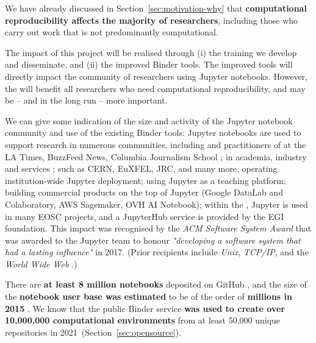 We have already discussed in Section~\ref{sec:motivation-why} that
\textbf{computational reproducibility affects the majority of researchers},
including those who carry out work that is not predominantly computational.

The impact of this project will be realised through (i) the training we develop
and disseminate, and (ii) the improved Binder tools. The improved tools will
directly impact the community of researchers using Jupyter notebooks. However,
the  will benefit all researchers who need computational reproducibility, and
may be -- and in the long run -- more important.

\medskip

We can give some indication of the size and activity of the Jupyter notebook
community and use of the existing Binder tools: Jupyter notebooks are used to
support research in numerous communities, including
{} and practitioners of  at the LA Times, BuzzFeed News, Columbia Journalism School
\cite{latimes-datadesk} \cite{columbia-nytimes} \cite{data-journalism};
 in academia, industry and services \cite{Perkel2018};
{} such as CERN, EuXFEL, JRC, and many more,
operating institution-wide Jupyter deployment;
{} using Jupyter as a teaching platform;
{} building commercial products on the
top of Jupyter (Google DataLab and Colaboratory, AWS Sagemaker, OVH AI Notebook);
within the , Jupyter is used in many EOSC
projects, and a JupyterHub service is provided by the EGI foundation.
This impact was recognised by the \emph{ACM Software System Award} that was
awarded to the Jupyter team to honour \emph{"developing a software system that
had a lasting influence"} in 2017. (Prior recipients include \emph{Unix},
\emph{TCP/IP}, and the \emph{World Wide Web} \cite{acm-award}.)

There are \textbf{at least 8 million notebooks} deposited on GitHub \cite{notebookcount}, and
the size of the \textbf{notebook user base was estimated} to be of the order of
\textbf{millions in 2015} \cite{jupyter-grant}. We know that the public Binder service \textbf{\mybinder{}
was used to create over 10,000,000 computational environments}
from at least 50,000 unique repositories in 2021~(Section~\ref{sec:opensource}).


